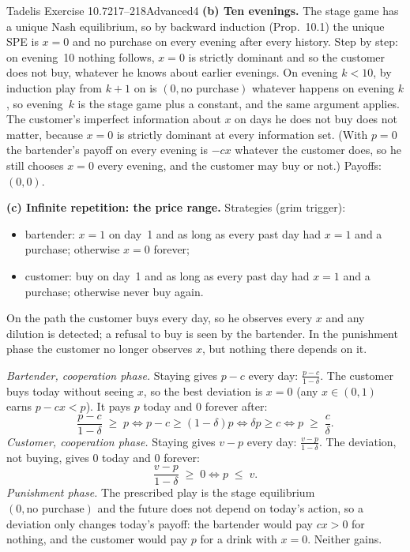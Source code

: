 \begin{exsol}{Tadelis Exercise 10.7}{217--218}{Advanced}{4}
\textbf{(b) Ten evenings.} The stage game has a unique Nash equilibrium, so by backward induction
(Prop.~10.1) the unique SPE is $x = 0$ and no purchase on every evening after every history.
Step by step: on evening~10 nothing follows, $x = 0$ is strictly dominant and so the customer does not
buy, whatever he knows about earlier evenings. On evening $k < 10$, by induction play from $k+1$ on is
$(0, \text{no purchase})$ whatever happens on evening $k$, so evening~$k$ is the stage game plus a
constant, and the same argument applies. The customer's imperfect information about $x$ on days he
does not buy does not matter, because $x = 0$ is strictly dominant at every information set.
(With $p = 0$ the bartender's payoff on every evening is $-cx$ whatever the customer does, so he
still chooses $x = 0$ every evening, and the customer may buy or not.) Payoffs: $(0,0)$.

\textbf{(c) Infinite repetition: the price range.} Strategies (grim trigger):
\begin{itemize}
  \item bartender: $x = 1$ on day~1 and as long as every past day had $x = 1$ and a purchase;
  otherwise $x = 0$ forever;
  \item customer: buy on day~1 and as long as every past day had $x = 1$ and a purchase; otherwise
  never buy again.
\end{itemize}
On the path the customer buys every day, so he observes every $x$ and any dilution is detected; a
refusal to buy is seen by the bartender. In the punishment phase the customer no longer observes $x$,
but nothing there depends on it.

\emph{Bartender, cooperation phase.} Staying gives $p - c$ every day: $\frac{p - c}{1-\delta}$. The
customer buys today without seeing $x$, so the best deviation is $x = 0$ (any $x \in (0,1)$ earns
$p - cx < p$). It pays $p$ today and $0$ forever after:
\[
  \frac{p - c}{1 - \delta} \;\ge\; p \iff p - c \ge (1-\delta)p \iff \delta p \ge c \iff
  p \;\ge\; \frac{c}{\delta} .
\]
\emph{Customer, cooperation phase.} Staying gives $v - p$ every day: $\frac{v - p}{1-\delta}$. The
deviation, not buying, gives $0$ today and $0$ forever:
\[
  \frac{v - p}{1-\delta} \;\ge\; 0 \iff p \;\le\; v .
\]
\emph{Punishment phase.} The prescribed play is the stage equilibrium $(0, \text{no purchase})$ and
the future does not depend on today's action, so a deviation only changes today's payoff: the
bartender would pay $cx > 0$ for nothing, and the customer would pay $p$ for a drink with $x = 0$.
Neither gains.


\end{exsol}

